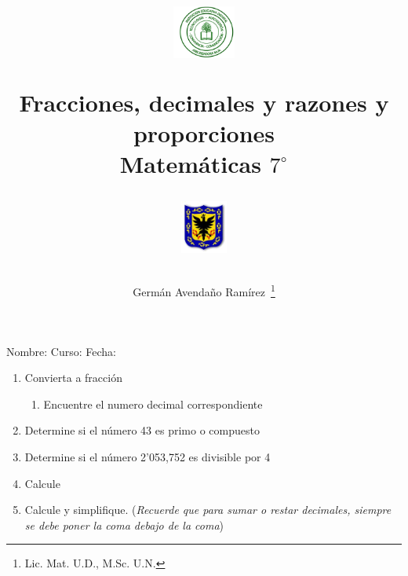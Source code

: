 \documentclass[10pt,twoside]{article}
\author{Germ\'an Avenda\~no Ram\'irez~\thanks{Lic. Mat. U.D., M.Sc. U.N.}}
\title{\begin{minipage}{.2\textwidth}
\includegraphics[height=1.75cm]{Images/logo-colegio.png}\end{minipage}
\begin{minipage}{.55\textwidth}
\begin{center}
Fracciones, decimales y razones y proporciones \\
Matemáticas $7^{\circ}$
\end{center}
\end{minipage}\hfill
\begin{minipage}{.2\textwidth}
\includegraphics[height=1.75cm]{Images/logo-sed.png} 
\end{minipage}}
\date{}
\begin{document}
\maketitle
Nombre: \hrulefill Curso: \underline{\hspace*{44pt}} Fecha: \underline{\hspace*{2.5cm}}
\begin{enumerate}
\item Convierta a fracción
\begin{enumerate}
\item Encuentre el numero decimal correspondiente
\begin{enumerate}
\end{enumerate}
\end{enumerate}
\item Determine si el número 43 es primo o compuesto
\item Determine si el número 2'053,752 es divisible por 4
\item Calcule
\begin{enumerate}
\end{enumerate}
\item Calcule y simplifique. (\emph{Recuerde que para sumar o restar decimales, siempre se debe poner la coma debajo de la coma})
\begin{enumerate}
\end{enumerate}
\end{enumerate}
\end{document}
